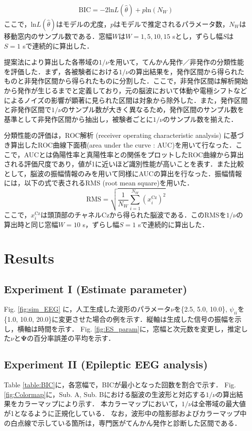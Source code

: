 \documentclass[journal]{IEEEtran}
\begin{document}
\begin{eqnarray}%
	\mathrm{BIC} = -2 \mathrm{ln}L(\hat{\theta}) + p \mathrm{ln}(N_W)
\end{eqnarray}
ここで，$\mathrm{ln}L(\hat{\theta})$はモデルの尤度，$p$はモデルで推定されるパラメータ数，$N_W$は移動窓内のサンプル数である．窓幅$W$は$W = 1, 5, 10, 15$ sとし，ずらし幅$S$は$S = 1$ sで連続的に算出した．

提案法により算出した各帯域の$1/\nu$を用いて，てんかん発作／非発作の分類性能を評価した．まず，各被験者における$1/\nu$の算出結果を，発作区間から得られたものと非発作区間から得られたものに分割した．ここで，非発作区間は解析開始から発作が生じるまでと定義しており，元の脳波において体動や電極シフトなどによるノイズの影響が顕著に見られた区間は対象から除外した．また，発作区間と非発作区間で$1/\nu$のサンプル数が大きく異なるため，発作区間のサンプル数を基準として非発作区間から抽出し，被験者ごとに$1/\nu$のサンプル数を揃えた．

分類性能の評価は，ROC解析 (receiver operating characteristic analysis) に基づき算出したROC曲線下面積(area under the curve : AUC)を用いて行なった．ここで，AUCとは偽陽性率と真陽性率との関係をプロットしたROC曲線から算出される評価尺度であり，値が1に近いほど識別性能が高いことを表す．また比較として，脳波の振幅情報のみを用いて同様にAUCの算出を行なった．振幅情報には，以下の式で表されるRMS (root mean square)を用いた\cite{Hamedi2014}．
\begin{equation}%
		\mathrm{RMS} = \sqrt{\frac{1}{N_W} \sum_{i=1}^{N_W} (x_i^\mathrm{Cz})^2}
\end{equation}
ここで，$x_i^\mathrm{Cz}$は頭頂部のチャネルCzから得られた脳波である．このRMSを$1/\nu$の算出時と同じ窓幅$W = 10$ s，ずらし幅$S = 1$ sで連続的に算出した．

\section{Results}
\subsection{Experiment I (Estimate parameter)}
Fig. \ref{fig:sim_EEG} に，人工生成した波形のパラメータ$\nu$を\{2.5, 5.0, 10.0\}, $\psi_{ii}$を\{1.0, 10.0, 20.0\}に変更させた場合の例を示す．縦軸は生成した信号の振幅を示し，横軸は時間を示す．
Fig. \ref{fig:ES_param}に，窓幅と次元数を変更し，推定した$\nu$と$\mathbf{\Psi}$の百分率誤差の平均を示す．

\subsection{Experiment II (Epileptic EEG analysis)}
Table \ref{table:BIC}に，各窓幅で，BICが最小となった回数を割合で示す．
Fig. \ref{fig:Colormap}に，Sub. A, Sub. Bにおける脳波の生波形と対応する$1/\nu$の算出結果をカラーマップにより示す．
本カラーマップにおいて，$1/\nu$は全帯域の最大値が1となるように正規化している．
なお，波形中の陰影部およびカラーマップ中の白点線で示している箇所は，専門医がてんかん発作と診断した区間である．
\end{document}
